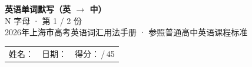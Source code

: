 \documentclass[10pt,a4paper]{article}
\begin{document}
\pagestyle{plain}

\begin{center}
{\LARGE\bfseries 英语单词默写（英 $\to$ 中）}\\[0.22em]
{\large N 字母 · 第 1 / 2 份}\\[0.18em]
{\small 2026年上海市高考英语词汇用法手册 · 参照普通高中英语课程标准}
\end{center}

\vspace{0.25em}
\noindent\begin{tabular}{@{}p{}@{}p{}@{}p{}@{}}
姓名：\underline{\hspace{2.0cm}} & 日期：\underline{\hspace{2.0cm}} & 得分：\underline{\hspace{1.3cm}}\,/\,45 \\
\end{tabular}

\vspace{0.3em}

\vspace{0.08em}
\end{document}

